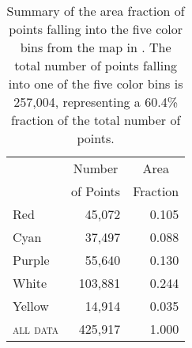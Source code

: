 \begin{table}
  \centering 
  \begin{tabular}{lrr}
	
  		 &  
		\multicolumn{1}{c}{Number} & 
		\multicolumn{1}{c}{Area}   \\
		
		&  
		\multicolumn{1}{c}{of Points} & 
		\multicolumn{1}{c}{Fraction}   \\


		\cmidrule(lr){2-2}
    	\cmidrule(lr){3-3}
	
   		Red & 
		45,072 & 
		0.105 \\
		
		Cyan & 
		37,497 & 
		0.088 \\
		
		Purple & 
		55,640 & 
		0.130 \\
		
		White & 
		103,881 & 
		0.244 \\
		
		Yellow & 
		14,914 & 
		0.035 \\
		
		\textsc{all data} & 
		425,917 & 
		1.000 \\

	\end{tabular}
  	\caption[Summary of color area fractions from ]{%
	Summary of the area fraction of points falling into the 
	five color bins from the map in . The total number of points falling into one of the five color bins is 257,004, representing a 60.4\% fraction of the total number of points.}
	\label{tab:sto001summary}
\end{table}

